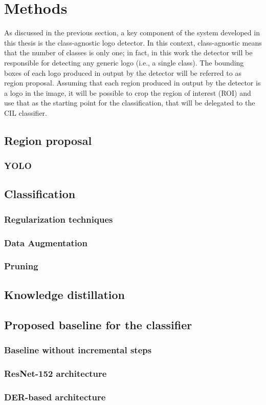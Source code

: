 \chapter{Methods}
\label{chap:methods}

As discussed in the previous section, a key component of the system developed in this thesis is the class-agnostic logo detector. In this context, class-agnostic means that the number of classes is only one; in fact, in this work the detector will be responsible for detecting any generic logo (i.e., a single class). The bounding boxes of each logo produced in output by the detector will be referred to as region proposal. Assuming that each region produced in output by the detector is a logo in the image, it will be possible to crop the region of interest (ROI) and use that as the starting point for the classification, that will be delegated to the CIL classifier.

\section{Region proposal}
\subsection{YOLO}
\section{Classification}
\label{sec:method-classidier}
\subsection{Regularization techniques}
\subsection{Data Augmentation}
\subsection{Pruning}
\section{Knowledge distillation}
\section{Proposed baseline for the classifier}
\subsection{Baseline without incremental steps}
\subsection{ResNet-152 architecture}
\subsection{DER-based architecture}